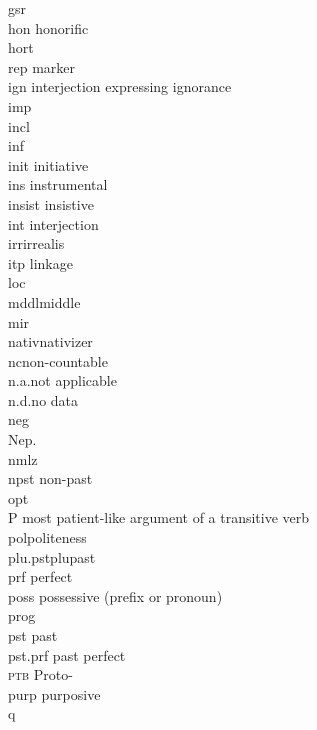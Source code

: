 \begin{refsection}
{\begin{tabbing}
{\sc gsr} \> \\
{\sc hon}\> honorific\\
{\sc hort} \> \\
{\sc rep}\>  marker\\
{\sc ign}\>  interjection expressing ignorance\\
{\sc imp} \> \\
{\sc incl}\> \\
{\sc inf} \> \\
{\sc init} \> initiative\\
{\sc ins} \> instrumental\\
{\sc insist} \> insistive\\
{\sc int} \> interjection\\
{\sc irr}\>irrealis\\
{\sc itp} \>  linkage\\
{\sc loc} 	 \>  \\
{\sc mddl}\>middle\\
{\sc mir} \> \\
{\sc nativ}\>nativizer\\
{\sc nc}\>non-countable\\
n.a.\>not applicable\\
n.d.\>no data\\
{\sc neg} \>	\\
Nep. \>	\\
{\sc nmlz} \>	\\
{\sc npst} \> non-past\\
{\sc opt} \> \\
P 	\> most patient-like argument of a transitive verb\\
{\sc pol}\>politeness\\
{\sc plu.pst}\>plupast\\
{\sc prf}\> perfect \\
{\sc poss} \> possessive (prefix or pronoun)\\
{\sc prog} \> \\
{\sc pst} \> past \\
{\sc pst.prf} \> past perfect\\
\textsc{ptb} \> Proto-\\
{\sc purp}\> purposive\\
{\sc q} \> \\

\end{tabbing}}
\end{refsection}
